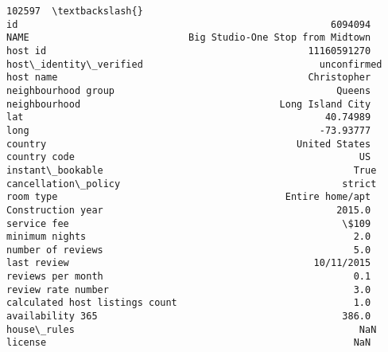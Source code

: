 \documentclass[11pt]{article}
\begin{document}
\begin{tcolorbox}[breakable, size=fbox, boxrule=.5pt, pad at break*=1mm, opacityfill=0]
\begin{Verbatim}[commandchars=\\\{\}]
                                                          102597  \textbackslash{}
id                                                       6094094
NAME                            Big Studio-One Stop from Midtown
host id                                              11160591270
host\_identity\_verified                               unconfirmed
host name                                            Christopher
neighbourhood group                                       Queens
neighbourhood                                   Long Island City
lat                                                     40.74989
long                                                   -73.93777
country                                            United States
country code                                                  US
instant\_bookable                                            True
cancellation\_policy                                       strict
room type                                        Entire home/apt
Construction year                                         2015.0
service fee                                                \$109
minimum nights                                               2.0
number of reviews                                            5.0
last review                                           10/11/2015
reviews per month                                            0.1
review rate number                                           3.0
calculated host listings count                               1.0
availability 365                                           386.0
house\_rules                                                  NaN
license                                                      NaN


\end{Verbatim}
\end{tcolorbox}
\end{document}
